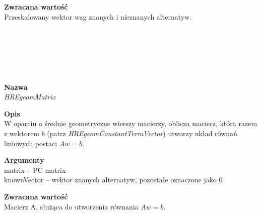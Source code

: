 \begin{spacing}{1.0}
\begin{spacing}{1.2}
\begin{spacing}{1.2}
\begin{spacing}{1.2}
\begin{spacing}{1.1}
\textbf{Zwracana wartość}\\ Przeskalowany wektor wag znanych i nieznanych alternatyw. \\ \begin{spacing}{0.3}  \end{spacing}\\

\\~\\
\begin{spacing}{1.1}
 \\ \begin{spacing}{0.5}  \end{spacing}

\textbf{Nazwa}\\ \emph{HREgeomMatrix} \\ \begin{spacing}{0.3}  \end{spacing}
 
\textbf{Opis}\\ W oparciu o średnie geometryczne wierszy macierzy, oblicza macierz, która razem z wektorem $b$ (patrz \textit{HREgeomConstantTermVector}) utworzy układ równań liniowych postaci $Aw = b$.\\  \begin{spacing}{0.3}  \end{spacing}
 
\textbf{Argumenty} \\
matrix -- PC matrix \\
knownVector -- wektor znanych alternatyw, pozostałe oznaczone jako $0$ \\ \begin{spacing}{0.3}  \end{spacing}

\textbf{Zwracana wartość}\\ Macierz A, służąca do utworzenia równania $Aw = b$. \\ \begin{spacing}{0.3}  \end{spacing}


\\~\\
\begin{spacing}{1.1}
 \\ \begin{spacing}{0.5}  \end{spacing}


\end{spacing}
\end{spacing}
\end{spacing}
\end{spacing}
\end{spacing}
\end{spacing}
\end{spacing}

